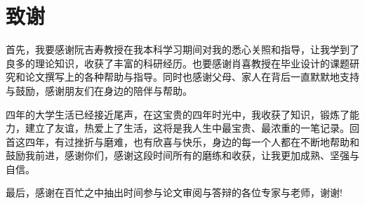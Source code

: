 
\chapter*{致谢}

首先，我要感谢阮吉寿教授在我本科学习期间对我的悉心关照和指导，让我学到了良多的理论知识，收获了丰富的科研经历。也要感谢肖喜教授在毕业设计的课题研究和论文撰写上的各种帮助与指导。同时也感谢父母、家人在背后一直默默地支持与鼓励，感谢朋友们在身边的陪伴与帮助。

四年的大学生活已经接近尾声，在这宝贵的四年时光中，我收获了知识，锻炼了能力，建立了友谊，热爱上了生活，这将是我人生中最宝贵、最浓重的一笔记录。回首这四年，有过挫折与磨难，也有欣喜与快乐，身边的每一个人都在不断地帮助和鼓励我前进，感谢你们，感谢这段时间所有的磨练和收获，让我更加成熟、坚强与自信。

最后，感谢在百忙之中抽出时间参与论文审阅与答辩的各位专家与老师，谢谢!